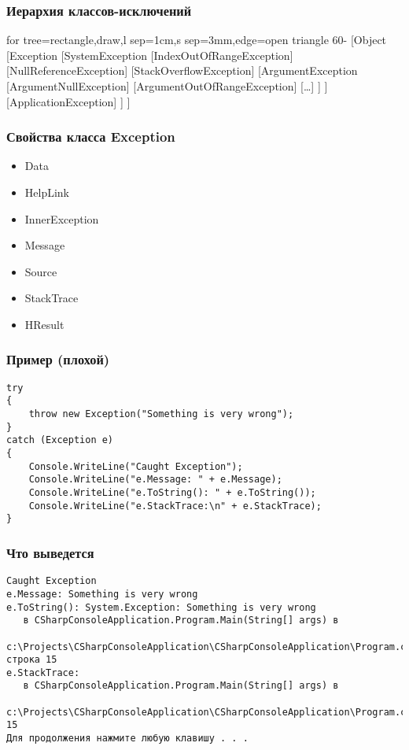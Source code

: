 \documentclass[xetex,mathserif,serif]{beamer}
\begin{document}
	\begin{frame}
		\frametitle{Иерархия классов-исключений}
		\begin{tiny}
			\begin{forest}
				for tree={rectangle,draw,l sep=1cm,s sep=3mm,edge=open triangle 60-}
				[Object
					[Exception
						[SystemException
							[IndexOutOfRangeException]
							[NullReferenceException]
							[StackOverflowException]
							[ArgumentException
								[ArgumentNullException]
								[ArgumentOutOfRangeException]
								[\dots]
							]
						]
						[ApplicationException]
					]
				]
			\end{forest}
		\end{tiny}
	\end{frame}

	\begin{frame}[fragile]
		\frametitle{Свойства класса Exception}
		\begin{itemize}
			\item Data
			\item HelpLink
			\item InnerException
			\item Message
			\item Source
			\item StackTrace
			\item HResult
		\end{itemize}
	\end{frame}

	\begin{frame}[fragile]
		\frametitle{Пример (плохой)}
		\begin{verbatim}
try
{
    throw new Exception("Something is very wrong");
}
catch (Exception e)
{
    Console.WriteLine("Caught Exception");
    Console.WriteLine("e.Message: " + e.Message);
    Console.WriteLine("e.ToString(): " + e.ToString());
    Console.WriteLine("e.StackTrace:\n" + e.StackTrace);
}
		\end{verbatim}
	\end{frame}

	\begin{frame}[fragile]
		\frametitle{Что выведется}
		\begin{scriptsize}
			\begin{verbatim}
Caught Exception
e.Message: Something is very wrong
e.ToString(): System.Exception: Something is very wrong
   в CSharpConsoleApplication.Program.Main(String[] args) в 
       c:\Projects\CSharpConsoleApplication\CSharpConsoleApplication\Program.cs: строка 15
e.StackTrace:
   в CSharpConsoleApplication.Program.Main(String[] args) в 
       c:\Projects\CSharpConsoleApplication\CSharpConsoleApplication\Program.cs:строка 15
Для продолжения нажмите любую клавишу . . .
			\end{verbatim}
		\end{scriptsize}
	\end{frame}
\end{document}

